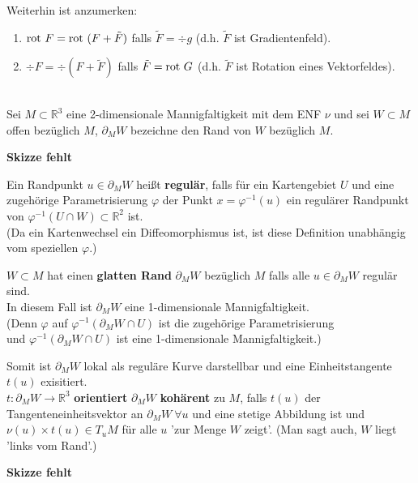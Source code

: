 Weiterhin ist anzumerken:\\

\begin{enumerate}
    \item
    $\mathrm{rot\ } F = \mathrm{rot\ } (F + \tilde{F}) $ falls $\tilde{F} = \div g $ 
    (d.h. $\tilde{F}$ ist Gradientenfeld).
    \item
    $\div F = \div (F + \tilde{F}) $ falls $\tilde{F} = \mathrm{rot\ } G $
    (d.h. $\tilde{F}$ ist Rotation eines Vektorfeldes).
\end{enumerate}

\begin{definition}
\mbox{}\\
Sei $M \subset \mathbb{R}^3 $ eine 2-dimensionale Mannigfaltigkeit mit dem ENF $\nu $
und sei $W \subset M $ offen bezüglich $M$, 
$\partial_M W $ bezeichne den Rand von $W$ bezüglich $M$.

\textbf{Skizze fehlt}

Ein Randpunkt $u \in \partial_M W $ heißt \textbf{regulär}, falls für ein Kartengebiet $U$
und eine zugehörige Parametrisierung $\varphi$ der Punkt $x = \varphi^{-1} (u) $
ein regulärer Randpunkt von $\varphi^{-1} (U \cap W) \subset \mathbb{R}^2 $ ist.\\
(Da ein Kartenwechsel ein Diffeomorphismus ist, ist diese Definition unabhängig vom
speziellen $\varphi$.)

$W \subset M $ hat einen \textbf{glatten Rand} $\partial_M W $ bezüglich $M$
falls alle  $u \in \partial_M W $ regulär sind.\\
In diesem Fall ist $\partial_M W $ eine 1-dimensionale Mannigfaltigkeit.\\
(Denn $\varphi$ auf $\varphi^{-1} (\partial_M W \cap U) $ 
ist die zugehörige Parametrisierung\\
und $\varphi^{-1} (\partial_M W \cap U) $ ist eine 1-dimensionale Mannigfaltigkeit.)

Somit ist $\partial_M W $ lokal als reguläre Kurve darstellbar und eine Einheitstangente
$t(u) $ exisitiert.\\
$t: \partial_M W \rightarrow \mathbb{R}^3 $ 
\textbf{orientiert} $\partial_M W $ \textbf{kohärent} zu $M$, 
falls $t(u) $ der Tangenteneinheitsvektor an $\partial_M W \ \forall u $ und
eine stetige Abbildung ist und 
$\nu(u) \times t(u) \in T_u M $ für alle $u$ 'zur Menge $W$ zeigt'.
(Man sagt auch, $W$ liegt 'links vom Rand'.)

\textbf{Skizze fehlt}

\end{definition}

